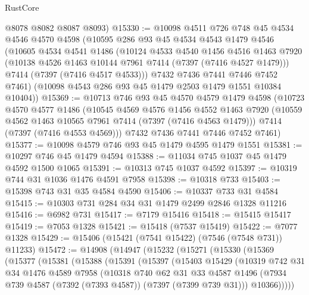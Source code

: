 \begin{lexlean}{RustCore}
\begin{coremodule}
      @8078
      @8082
      @8087
      @8093)
@15330 := @10098
    @4511
    @726
    @748
    @45
    @4534
    @4546
    @4570
    @4598
    (@10595
      @286
      @93
      @45
      @4534
      @4543
      @1479
      @4546
      (@10605
        @4534
        @4541
        @1486
        (@10124
          @4533
          @4540
          @1456
          @4516
          @1463
          @7920
          (@10138 @4526 @1463 @10144 @7961 @7414 (@7397 (@7416 @4527 @1479)))
          @7414
          (@7397 (@7416 @4517 @4533)))
        @7432
        @7436
        @7441
        @7446
        @7452
        @7461)
      (@10098 @4543 @286 @93 @45 @1479 @2503 @1479 @1551 @10384 @10404))
@15369 := @10713
    @746
    @93
    @45
    @4570
    @4579
    @1479
    @4598
    (@10723
      @4570
      @4577
      @1486
      (@10545
        @4569
        @4576
        @1456
        @4552
        @1463
        @7920
        (@10559 @4562 @1463 @10565 @7961 @7414 (@7397 (@7416 @4563 @1479)))
        @7414
        (@7397 (@7416 @4553 @4569)))
      @7432
      @7436
      @7441
      @7446
      @7452
      @7461)
@15377 := @10098 @4579 @746 @93 @45 @1479 @4595 @1479 @1551
@15381 := @10297 @746 @45 @1479 @4594
@15388 := @11034 @745 @1037 @45 @1479 @4592 @1500 @1065
@15391 := @10313 @745 @1037 @4592
@15397 := @10319 @744 @31 @1036 @1476 @4591 @7958
@15398 := @10318 @733
@15403 := @15398 @743 @31 @35 @4584 @4590
@15406 := @10337 @733 @31 @4584
@15415 := @10303 @731 @284 @34 @31 @1479 @2499 @2846 @1328 @11216
@15416 := @6982 @731
@15417 := @7179 @15416
@15418 := @15415 @15417
@15419 := @7053 @1328
@15421 := @15418 (@7537 @15419)
@15422 := @7077 @1328
@15429 := @15406 (@15421 (@7541 @15422) (@7546 (@7548 @731)) @11233)
@15472 := @14908
    (@14947
      (@15232
        (@15271
          (@15330
            (@15369
              (@15377
                (@15381
                  (@15388
                    (@15391
                      (@15397
                        (@15403
                          @15429
                          (@10319
                            @742
                            @31
                            @34
                            @1476
                            @4589
                            @7958
                            (@10318
                              @740
                              @62
                              @31
                              @33
                              @4587
                              @1496
                              (@7934 @739 @4587 (@7392 (@7393 @4587)) (@7397 (@7399 @739 @31)))
                              @10366)))))

\end{coremodule}
\end{lexlean}
